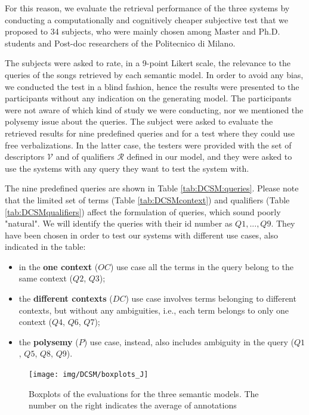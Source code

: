 For this reason, we evaluate the retrieval performance of the three systems by conducting a computationally and cognitively cheaper subjective test that we proposed to 34 subjects, who were mainly chosen among Master and Ph.D. students and Post-doc researchers of the Politecnico di Milano.
 
The subjects were asked to rate, in a 9-point Likert scale, the relevance to the queries of the songs retrieved by each semantic model. In order to avoid any bias, we conducted the test in a blind fashion, hence the results were presented to the participants without any indication on the generating model. The participants were not aware of which kind of study we were conducting, nor we mentioned the polysemy issue about the queries.
The subject were asked to evaluate the retrieved results for nine predefined queries and for a test where they could use free verbalizations. In the latter case, the testers were provided with the set of descriptors $\mathcal{V}$ and of qualifiers $\mathcal{R}$ defined in our model, and they were asked to use the systems with any query they want to test the system with.


The nine predefined queries are shown in Table \ref{tab:DCSM:queries}. Please note that the limited set of terms (Table \ref{tab:DCSMcontext}) and qualifiers (Table \ref{tab:DCSMqualifiers}) affect the formulation of queries, which sound poorly "natural". We will identify the queries with their id number as $Q1,...,Q9$. They have been chosen in order to test our systems with different use cases, also indicated in the table:
\begin{itemize}
\item in the \textbf{one context} ($OC$) use case  all the terms in the query belong to the same context ($Q2$, $Q3$);
\item the \textbf{different contexts} ($DC$) use case involves terms belonging to different contexts, but without any ambiguities, i.e., each term belongs to only one context ($Q4$, $Q6$, $Q7$);
\item the \textbf{polysemy} ($P$) use case, instead, also includes ambiguity in the query ($Q1$, $Q5$, $Q8$, $Q9$).
\end{itemize}

\begin{figure}[!tb]
        \centering
         \texttt{[image: img/DCSM/boxplots\_J]}       
		\caption{Boxplots of the evaluations for the three semantic models. The number on the right indicates the average of annotations}
		\label{fig:DCSMresults}
\end{figure}


